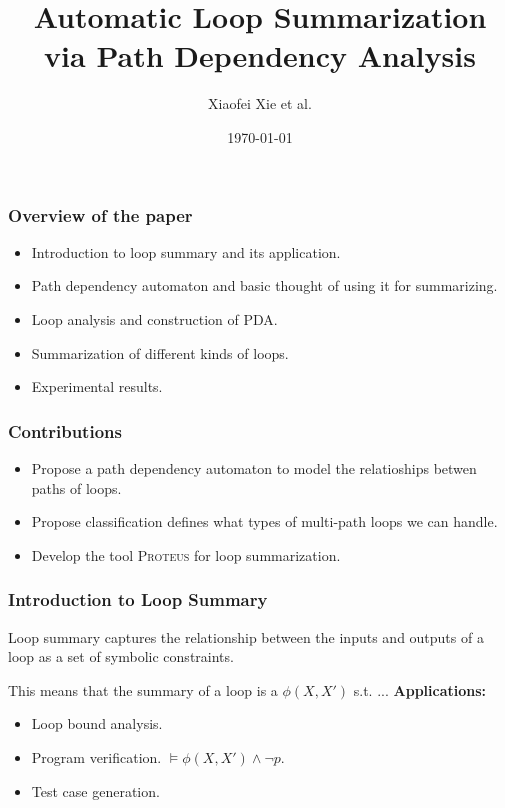 \documentclass[11pt]{beamer}
\title{Automatic Loop Summarization via Path Dependency Analysis}
\date{\today}
\author{Xiaofei Xie et al.}
\begin{document}
\maketitle
\begin{frame}\frametitle{Overview of the paper}

\begin{itemize}
\item Introduction to loop summary and its application.
\item Path dependency automaton and basic thought of using it for summarizing.

\item Loop analysis and construction of PDA.
\item Summarization of different kinds of loops.

\item Experimental results.
\end{itemize}
\end{frame}
\begin{frame}\frametitle{Contributions}
\begin{itemize}
\item Propose a path dependency automaton to model the relatioships betwen paths of loops.
\item Propose classification defines what types of multi-path loops we can handle.
\item Develop the tool \textsc{Proteus} for loop summarization.
\end{itemize}
\end{frame}
\begin{frame}\frametitle{Introduction to Loop Summary}
Loop summary captures the relationship between the inputs and outputs of a loop as a set of symbolic constraints.

This means that the summary of a loop is a $\phi(X, X')$ s.t. ...
\textbf{Applications:}
\begin{itemize}
\item Loop bound analysis.
\item Program verification. $\models\phi(X, X') \wedge \neg p$.
\item Test case generation.

\end{itemize}
\end{frame}
\end{document}
